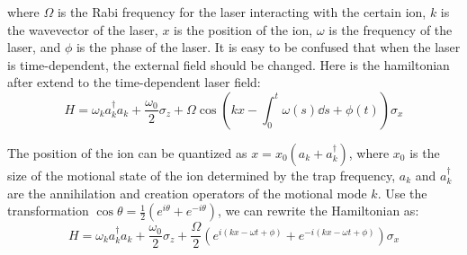 \documentclass{simple-notes}
\begin{document}
where $\Omega$ is the Rabi frequency for the laser interacting with the certain ion, $k$ is the wavevector of the laser, $x$ is the position of the ion, $\omega$ is the frequency of the laser, and $\phi$ is the phase of the laser. 
It is easy to be confused that when the laser is time-dependent, the external field should be changed. 
Here is the hamiltonian after extend to the time-dependent laser field:
\begin{equation}
H =  \omega_k a_k^\dagger a_k +  \frac{\omega_0}{2} \sigma_z +  {\Omega} \cos(k x - {\int_0^t\omega(s) \dd s} + \phi(t))\sigma_x 
\end{equation}

The position of the ion can be quantized as $x = x_0 (a_k + a_k^\dagger)$, where $x_0$ is the size of the motional state of the ion determined by the trap frequency, $a_k$ and $a_k^\dagger$ are the annihilation and creation operators of the motional mode $k$. Use the transformation $\cos\theta = \frac{1}{2} (e^{i\theta} + e^{-i\theta})$, we can rewrite the Hamiltonian as:
\begin{equation}
    H =  \omega_k a_k^\dagger a_k +  \frac{\omega_0}{2} \sigma_z +  \frac{\Omega}{2} (e^{i(k x - \omega t + \phi)} + e^{-i(k x - \omega t + \phi)})\sigma_x 
\end{equation}
\end{document}
